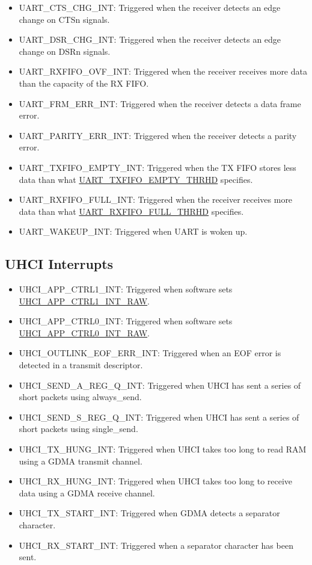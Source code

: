 \documentclass[main\_\_EN.tex]{subfiles}
\begin{document}
\begin{itemize}
\item \label{int:UARTCTSCHGINT}UART\_CTS\_CHG\_INT: Triggered when the receiver detects an edge change on CTSn signals.
\item \label{int:UARTDSRCHGINT}UART\_DSR\_CHG\_INT: Triggered when the receiver detects an edge change on DSRn signals.
\item \label{int:UARTRXFIFOOVFINT}UART\_RXFIFO\_OVF\_INT: Triggered when the receiver receives more data than the capacity of the RX FIFO.
\item \label{int:UARTFRMERRINT}UART\_FRM\_ERR\_INT: Triggered when the receiver detects a data frame error.
\item \label{int:UARTPARITYERRINT}UART\_PARITY\_ERR\_INT: Triggered when the receiver detects a parity error.
\item \label{int:UARTTXFIFOEMPTYINT}UART\_TXFIFO\_EMPTY\_INT: Triggered when the TX FIFO stores less data than what \hyperref[fielddesc:UARTTXFIFOEMPTYTHRHD]{UART\_TXFIFO\_EMPTY\_THRHD} specifies.
\item \label{int:UARTRXFIFOFULLINT}UART\_RXFIFO\_FULL\_INT: Triggered when the receiver receives more data than what \hyperref[fielddesc:UARTRXFIFOFULLTHRHD]{UART\_RXFIFO\_FULL\_THRHD} specifies.
\item \label{int:UARTWAKEUPINT}UART\_WAKEUP\_INT: Triggered when UART is woken up.
\end{itemize}

\subsection{UHCI Interrupts}
\begin{itemize}
\item \label{int:UHCIAPPCTRL1INT}UHCI\_APP\_CTRL1\_INT: Triggered when software sets \hyperref[fielddesc:UHCIAPPCTRL1INTRAW]{UHCI\_APP\_CTRL1\_INT\_RAW}.
\item \label{int:UHCIAPPCTRL0INT}UHCI\_APP\_CTRL0\_INT: Triggered when software sets \hyperref[fielddesc:UHCIAPPCTRL0INTRAW]{UHCI\_APP\_CTRL0\_INT\_RAW}.
\item \label{int:UHCIOUTLINKEOFERRINT}UHCI\_OUTLINK\_EOF\_ERR\_INT: Triggered when an EOF error is detected in a transmit descriptor.
\item \label{int:UHCISENDAREGQINT}UHCI\_SEND\_A\_REG\_Q\_INT: Triggered when UHCI has sent a series of short packets using always\_send.
\item \label{int:UHCISENDSREGQINT}UHCI\_SEND\_S\_REG\_Q\_INT: Triggered when UHCI has sent a series of short packets using single\_send.
\item \label{int:UHCITXHUNGINT}UHCI\_TX\_HUNG\_INT: Triggered when UHCI takes too long to read RAM using a GDMA transmit channel.
\item \label{int:UHCIRXHUNGINT}UHCI\_RX\_HUNG\_INT: Triggered when UHCI takes too long to receive data using a GDMA receive channel.
\item \label{int:UHCITXSTARTINT}UHCI\_TX\_START\_INT: Triggered when GDMA detects a separator character.
\item \label{int:UHCIRXSTARTINT}UHCI\_RX\_START\_INT: Triggered when a separator character has been sent.
\end{itemize}
\end{document}
